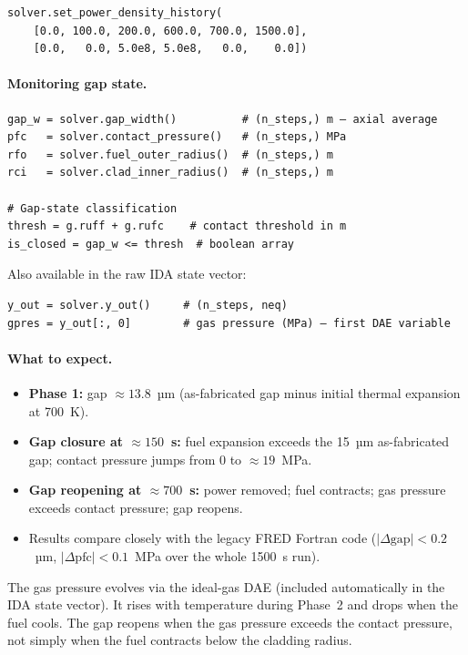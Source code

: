 \documentclass[11pt,a4paper]{article}
\begin{document}
\begin{lstlisting}
solver.set_power_density_history(
    [0.0, 100.0, 200.0, 600.0, 700.0, 1500.0],
    [0.0,   0.0, 5.0e8, 5.0e8,   0.0,    0.0])
\end{lstlisting}

\paragraph{Monitoring gap state.}

\begin{lstlisting}
gap_w = solver.gap_width()          # (n_steps,) m — axial average
pfc   = solver.contact_pressure()   # (n_steps,) MPa
rfo   = solver.fuel_outer_radius()  # (n_steps,) m
rci   = solver.clad_inner_radius()  # (n_steps,) m

# Gap-state classification
thresh = g.ruff + g.rufc    # contact threshold in m
is_closed = gap_w <= thresh  # boolean array
\end{lstlisting}

Also available in the raw IDA state vector:

\begin{lstlisting}
y_out = solver.y_out()     # (n_steps, neq)
gpres = y_out[:, 0]        # gas pressure (MPa) — first DAE variable
\end{lstlisting}

\paragraph{What to expect.}

\begin{itemize}
  \item \textbf{Phase 1:} gap $\approx 13.8$~µm (as-fabricated gap minus
        initial thermal expansion at 700~K).
  \item \textbf{Gap closure at $\approx 150$~s:} fuel expansion exceeds the
        15~µm as-fabricated gap; contact pressure jumps from 0 to $\approx 19$~MPa.
  \item \textbf{Gap reopening at $\approx 700$~s:} power removed; fuel
        contracts; gas pressure exceeds contact pressure; gap reopens.
  \item Results compare closely with the legacy FRED Fortran code
        ($|\Delta\text{gap}| < 0.2$~µm, $|\Delta\text{pfc}| < 0.1$~MPa over
        the whole 1500~s run).
\end{itemize}

\begin{infobox}
  The gas pressure evolves via the ideal-gas DAE (included automatically
  in the IDA state vector).  It rises with temperature during Phase~2
  and drops when the fuel cools.  The gap reopens when the gas pressure
  exceeds the contact pressure, not simply when the fuel contracts below
  the cladding radius.
\end{infobox}
\end{document}
